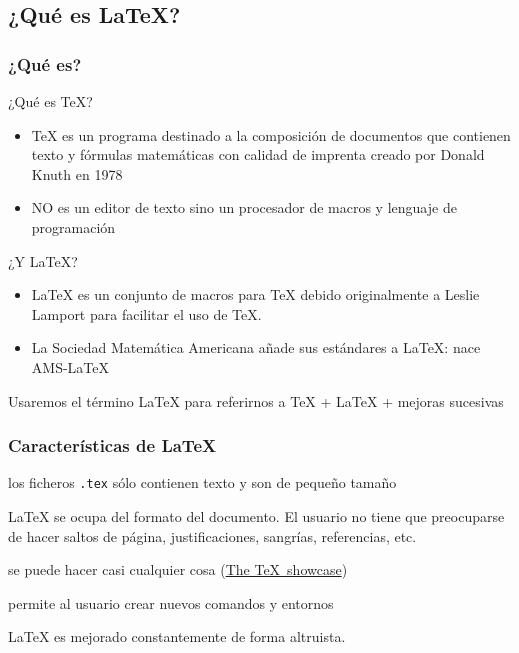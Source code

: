 \documentclass[10pt,xcolor=svgnames]{beamer}
\begin{document}
\subsection{¿Qué es \LaTeX?}

\begin{frame}
  \frametitle{¿Qué es?}
  \begin{block}{¿Qué es \TeX?}
    \begin{itemize}
      \item \TeX{} es un programa destinado a la composición de documentos que contienen texto y fórmulas matemáticas con calidad de imprenta creado por Donald Knuth en 1978
      \item NO es un editor de texto sino un procesador de macros y lenguaje de programación
    \end{itemize}
  \end{block}
  \begin{block}{¿Y \LaTeX?}
    \begin{itemize}
      \item \LaTeX{} es un conjunto de macros para \TeX{}  debido originalmente a Leslie Lamport para facilitar el uso de \TeX.
      \item La Sociedad Matemática Americana añade sus estándares a \LaTeX{}: nace AMS-\LaTeX
    \end{itemize}
  \end{block}

  Usaremos el término \alert{\LaTeX{}} para referirnos a \TeX{} + \LaTeX{} + mejoras sucesivas
\end{frame}




\begin{frame}
  \frametitle{Características de \LaTeX}
  \begin{description}[Transportabiilidad]
    \addtolength\itemsep{\fill}
  \item[Transportable] los ficheros \texttt{.tex} sólo contienen texto y son de pequeño tamaño 
  \item[Estructurado] \LaTeX{} se ocupa del formato del documento. El usuario no tiene que preocuparse de hacer saltos de página, justificaciones, sangrías, referencias, etc.
  \item[Versátil] se puede hacer casi cualquier cosa (\href{https://www.tug.org/texshowcase/}{The \TeX\ showcase})
  \item[Flexible] permite al usuario crear nuevos comandos y entornos 
  \item[Actualizado] \LaTeX{} es mejorado constantemente de forma altruista.
\end{description}
\end{frame}
\end{document}

